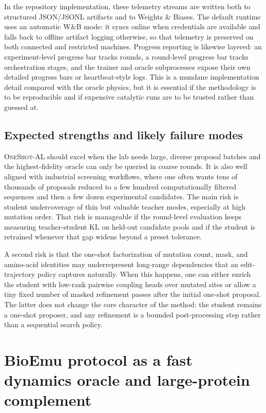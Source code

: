 \documentclass[11pt]{article}
\newcommand{\methodIII}{\textsc{OneShot-AL}}
\begin{document}
	In the repository implementation, these telemetry streams are written both to structured JSON/JSONL artifacts and to Weights \& Biases. The default runtime uses an automatic W\&B mode: it syncs online when credentials are available and falls back to offline artifact logging otherwise, so that telemetry is preserved on both connected and restricted machines. Progress reporting is likewise layered: an experiment-level progress bar tracks rounds, a round-level progress bar tracks orchestration stages, and the trainer and oracle subprocesses expose their own detailed progress bars or heartbeat-style logs. This is a mundane implementation detail compared with the oracle physics, but it is essential if the methodology is to be reproducible and if expensive catalytic runs are to be trusted rather than guessed at.
	
	\subsection{Expected strengths and likely failure modes}
	
	\methodIII{} should excel when the lab needs large, diverse proposal batches and the highest-fidelity oracle can only be queried in coarse rounds. It is also well aligned with industrial screening workflows, where one often wants tens of thousands of proposals reduced to a few hundred computationally filtered sequences and then a few dozen experimental candidates. The main risk is student undercoverage of thin but valuable teacher modes, especially at high mutation order. That risk is manageable if the round-level evaluation keeps measuring teacher-student KL on held-out candidate pools and if the student is retrained whenever that gap widens beyond a preset tolerance.
	
	A second risk is that the one-shot factorization of mutation count, mask, and amino-acid identities may underrepresent long-range dependencies that an edit-trajectory policy captures naturally. When this happens, one can either enrich the student with low-rank pairwise coupling heads over mutated sites or allow a tiny fixed number of masked refinement passes after the initial one-shot proposal. The latter does not change the core character of the method: the student remains a one-shot proposer, and any refinement is a bounded post-processing step rather than a sequential search policy.
	
	
	\section{BioEmu protocol as a fast dynamics oracle and large-protein complement}
	\label{sec:bioemu}
	
\end{document}
